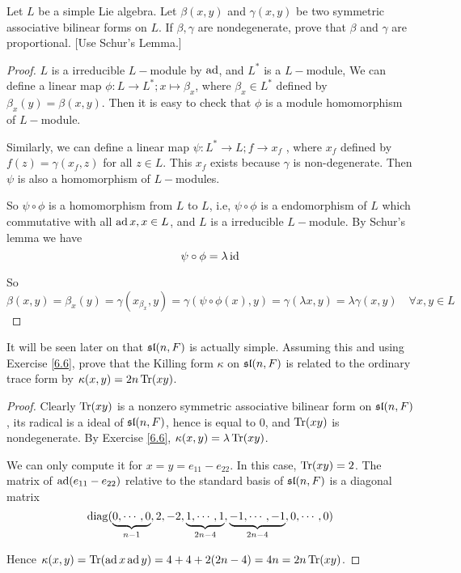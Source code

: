 \begin{ex}\label{6.6}
  Let $L$ be a simple Lie algebra. Let $\beta(x, y)$ and $\gamma(x, y)$ be two symmetric associative bilinear forms on $L$.
  If $\beta,\gamma$ are nondegenerate, prove that $\beta$ and $\gamma$ are proportional. [Use Schur's Lemma.]
\end{ex}
\begin{proof}
  $L$ is a irreducible $L-$module by $\ad$, and $L^{\ast}$ is a $L-$module, We can define a linear map $\phi\colon L \to L^{\ast}; x \mapsto \beta_x$, where $\beta_x \in L^{\ast}$ defined by $\beta_x(y) = \beta(x,y)$. Then it is easy to check that $\phi$ is a module homomorphism of $L-$module.

  Similarly, we can define a linear map $\psi\colon L^{\ast} \to L; f \to x_f$ , where $x_f$ defined by $f(z) = \gamma(x_f,z)$ for all $z \in L$. This $x_f$ exists because $\gamma$ is non-degenerate. Then $\psi$ is also a homomorphism of $L-$modules.

  So $\psi\circ\phi$ is a homomorphism from $L$ to $L$, i.e, $\psi\circ\phi$ is a endomorphism of $L$ which commutative with all $\ad x, x\in L$, and $L$ is a irreducible $L-$module. By Schur's lemma we have
  \begin{equation*}
    \psi\circ\phi=\lambda\id
  \end{equation*}

  So
  \begin{equation*}
    \beta(x,y)=\beta_x(y)=\gamma(x_{\beta_x},y)=\gamma(\psi\circ\phi(x),y)=\gamma(\lambda x,y)=\lambda\gamma(x,y)\quad \forall x,y\in L
  \end{equation*}
\end{proof}

\begin{ex}
  It will be seen later on that $\sl(n, F)$ is actually simple. Assuming this and using Exercise \ref{6.6}, prove that the Killing form $\kappa$ on $\sl(n,F)$ is related to the ordinary trace form by $\kappa(x,y) = 2n\Tr(xy)$.
\end{ex}
\begin{proof}
  Clearly $\Tr(xy)$ is a nonzero symmetric associative bilinear form on $\sl(n,F)$, its radical is a ideal of $\sl(n,F)$, hence is equal to $0$, and $\Tr(xy)$ is nondegenerate. By Exercise \ref{6.6}, $\kappa(x,y) = \lambda\Tr(xy)$.

  We can only compute it for $x = y = e_{11} - e_{22}$. In this case, $\Tr(xy) = 2$. The matrix of $\ad(e_{11} - e_{22})$ relative to the standard basis of $\sl(n, F)$ is a diagonal matrix
  \begin{equation*}
    \diag(\underbrace{0,\cdots,0}_{n-1},2,-2,\underbrace{1,\cdots,1}_{2n-4},\underbrace{-1,\cdots,-1}_{2n-4},0,\cdots,0)
  \end{equation*}

  Hence $\kappa(x, y) = \Tr(\ad x\ad y) = 4 + 4 + 2(2n - 4) = 4n = 2n\Tr(xy)$.
\end{proof}

